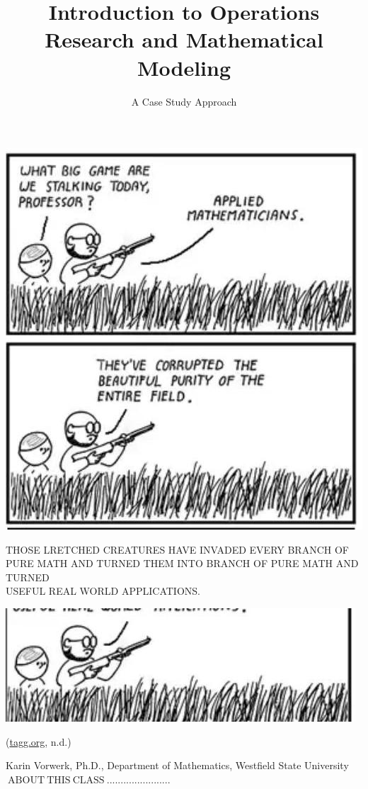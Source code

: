 \documentclass[10pt]{article}
\title{Introduction to Operations Research and Mathematical Modeling }
\author{A Case Study Approach}
\date{}
\begin{document}
\maketitle

\includegraphics[max width=\textwidth]{2022_07_05_5945264bba2a5f6ba667g-01}

THOSE LRETCHED CREATURES HAVE INVADED EVERY BRANCH OF PURE MATH AND TURNED THEM INTO BRANCH OF PURE MATH AND TURNED\\
USEFUL REAL WORLD APPLICATIONS.

\includegraphics[max width=\textwidth]{2022_07_05_5945264bba2a5f6ba667g-01(1)}

(\href{http://tagg.org}{tagg.org}, n.d.)

Karin Vorwerk, Ph.D., Department of Mathematics, Westfield State University $\mathrm{~ A B O U T ~ T H I S ~ C L A S S ~ . . . . . . . . . . . . . . . . . . . . . . .}$
\end{document}
